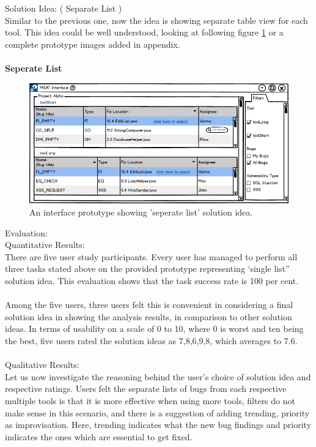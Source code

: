 Solution Idea: ( Separate List ) \\

Similar to the previous one, now the idea is showing separate table view for each tool. This idea could be well understood, looking at following figure \ref{fig:S11_seperate_list} or a complete prototype images added in appendix. \\ \\

\textbf{Seperate List}
\begin{figure}[hbt!]
	\centering
	\includegraphics[width=\linewidth]{figures/solution_ideas_snaps/S11_seperate_list}
	\caption{An interface prototype showing 'seperate list' solution idea.}
	\label{fig:S11_seperate_list}
\end{figure}

Evaluation: \\

Quantitative Results: \\

There are five user study participants. Every user has managed to perform all three tasks stated above on the provided prototype representing ‘single list” solution idea. This evaluation shows that the task success rate is 100 per cent. \\ \\

Among the five users, three users felt this is convenient in considering a final solution idea in showing the analysis results, in comparison to other solution ideas.  In terms of usability on a scale of 0 to 10, where 0 is worst and ten being the best, five users rated the solution ideas as 7,8,6,9,8, which averages to 7.6. \\ \\


Qualitative Results: \\

Let us now investigate the reasoning behind the user’s choice of solution idea and respective ratings. Users felt the separate lists of bugs from each respective multiple tools is that it is more effective when using more tools, filters do not make sense in this scenario, and there is a suggestion of adding trending, priority as improvisation. Here, trending indicates what the new bug findings and priority indicates the ones which are essential to get fixed. \\ \\

